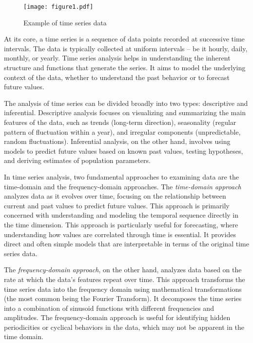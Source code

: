 \begin{figure}[b]
\centering

\texttt{[image: figure1.pdf]}
\caption{Example of time series data}
\label{fig:figure1}
\end{figure}

At its core, a time series is a sequence of data points recorded at successive time intervals. The data is typically collected at uniform intervals -- be it hourly, daily, monthly, or yearly. Time series analysis helps in understanding the inherent structure and functions that generate the series. It aims to model the underlying context of the data, whether to understand the past behavior or to forecast future values.

The analysis of time series can be divided broadly into two types: descriptive and inferential. Descriptive analysis focuses on visualizing and summarizing the main features of the data, such as trends (long-term direction), seasonality (regular pattern of fluctuation within a year), and irregular components (unpredictable, random fluctuations). Inferential analysis, on the other hand, involves using models to predict future values based on known past values, testing hypotheses, and deriving estimates of population parameters.

In time series analysis, two fundamental approaches to examining data are the time-domain and the frequency-domain approaches. The \emph{time-domain approach} analyzes data as it evolves over time, focusing on the relationship between current and past values to predict future values. This approach is primarily concerned with understanding and modeling the temporal sequence directly in the time dimension. This approach is particularly useful for forecasting, where understanding how values are correlated through time is essential. It provides direct and often simple models that are interpretable in terms of the original time series data.

The \emph{frequency-domain approach}, on the other hand, analyzes data based on the rate at which the data's features repeat over time. This approach transforms the time series data into the frequency domain using mathematical transformations (the most common being the Fourier Transform). It decomposes the time series into a combination of sinusoid functions with different frequencies and amplitudes. The frequency-domain approach is useful for identifying hidden periodicities or cyclical behaviors in the data, which may not be apparent in the time domain.

